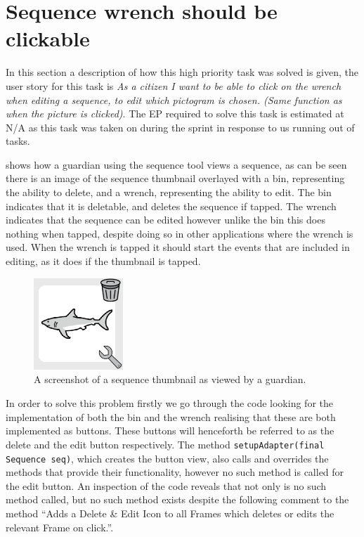 \section{Sequence wrench should be clickable}
In this section a description of how this high priority task was solved is given, the user story for this task is \textit{As a citizen I want to be able to click on the wrench when editing a sequence, to edit which pictogram is chosen. (Same function as when the picture is clicked)}.
The EP required to solve this task is estimated at N/A as this task was taken on during the sprint in response to us running out of tasks.

 shows how a guardian using the sequence tool views a sequence, as can be seen there is an image of the sequence thumbnail overlayed with a bin, representing the ability to delete, and a wrench, representing the ability to edit.
The bin indicates that it is deletable, and deletes the sequence if tapped.
The wrench indicates that the sequence can be edited however unlike the bin this does nothing when tapped, despite doing so in other applications where the wrench is used.
When the wrench is tapped it should start the events that are included in editing, as it does if the thumbnail is tapped.
\begin{figure}
    \centering
    \includegraphics[width=0.3\textwidth]{figures/img/screenshots/sequence_pictogram.png} 
    \caption{A screenshot of a sequence thumbnail as viewed by a guardian.}
    \label{fig:seq_wrench} 
    \vspace{10pt}
\end{figure}
\bigskip
\noindent
In order to solve this problem firstly we go through the code looking for the implementation of both the bin and the wrench realising that these are both implemented as buttons.
These buttons will henceforth be referred to as the delete and the edit button respectively.
The method \texttt{setupAdapter(final Sequence seq)}, which creates the button view, also calls and overrides the methods that provide their functionality, however no such method is called for the edit button.
An inspection of the code reveals that not only is no such method called, but no such method exists despite the following comment to the method ``\/\/Adds a Delete \& Edit Icon to all Frames which deletes or edits the relevant Frame on click.''.


